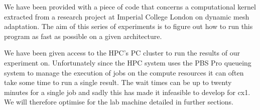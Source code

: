 We have been provided with a piece of code that concerns a computational kernel extracted from a research project at Imperial College London on dynamic mesh adaptation\cite{pragmatic}.
The aim of this series of experiments is to figure out how to run this program as fast as possible on a given architecture.

We have been given access to the HPC's PC cluster to run the results of our experiment on.
Unfortunately since the HPC system uses the PBS Pro queueing system to manage the execution of jobs on the compute resources it can often take some time to run a single result. The wait times can be up to twenty minutes for a single job and sadly this has made it infeasible to develop for cx1. We will therefore optimise for the lab machine detailed in further sections.